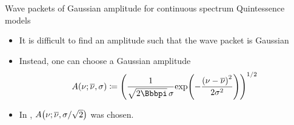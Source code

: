 \documentclass[8pt]{beamer}
\begin{document}

\begin{frame}%
{Wave packets of Gaussian amplitude for continuous spectrum}%
{Quintessence models}
\begin{itemize}
\item It is difficult to find an amplitude such that the wave packet is
Gaussian
\item Instead, one can choose a Gaussian amplitude
\begin{align}
\rfun{A}{\nu; \overline{\nu},\sigma} \coloneqq
\rbr{\frac{1}{\sqrt{2\pp}\,\sigma}\rfun{\exp}{
-\frac{\rbr{\nu-\overline{\nu}}^2}{2\sigma^2}}}^{1/2}
\end{align}

\item In ,
${A}\mathopen{}\left(\nu;\overline{\nu},\sigma/\sqrt{2}\right)\mathclose{}$ was chosen.

\end{itemize}
\end{frame}
\end{document}
